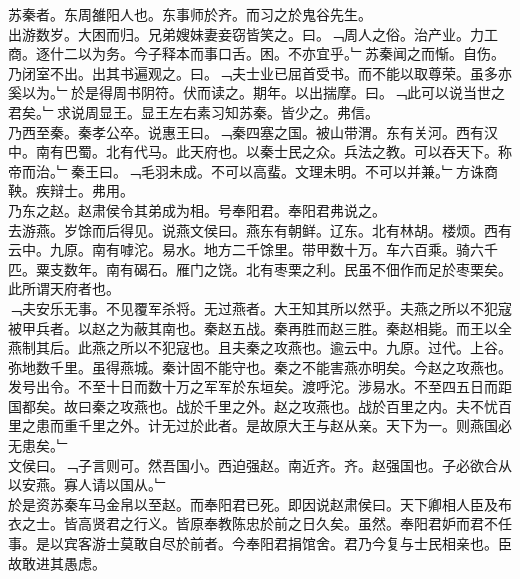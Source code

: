 \documentclass{zhvt-classic}
\begin{document}

\hspace*{2em}苏秦者。东周雒阳人也。东事师於齐。而习之於鬼谷先生。\\
\hspace*{2em}出游数岁。大困而归。兄弟嫂妹妻妾窃皆笑之。曰。﹁周人之俗。治产业。力工商。逐什二以为务。今子释本而事口舌。困。不亦宜乎。﹂苏秦闻之而惭。自伤。乃闭室不出。出其书遍观之。曰。﹁夫士业已屈首受书。而不能以取尊荣。虽多亦奚以为。﹂於是得周书阴符。伏而读之。期年。以出揣摩。曰。﹁此可以说当世之君矣。﹂求说周显王。显王左右素习知苏秦。皆少之。弗信。\\
\hspace*{2em}乃西至秦。秦孝公卒。说惠王曰。﹁秦四塞之国。被山带渭。东有关河。西有汉中。南有巴蜀。北有代马。此天府也。以秦士民之众。兵法之教。可以吞天下。称帝而治。﹂秦王曰。﹁毛羽未成。不可以高蜚。文理未明。不可以并兼。﹂方诛商鞅。疾辩士。弗用。\\
\hspace*{2em}乃东之赵。赵肃侯令其弟成为相。号奉阳君。奉阳君弗说之。\\
\hspace*{2em}去游燕。岁馀而后得见。说燕文侯曰。燕东有朝鲜。辽东。北有林胡。楼烦。西有云中。九原。南有嘑沱。易水。地方二千馀里。带甲数十万。车六百乘。骑六千匹。粟支数年。南有碣石。雁门之饶。北有枣栗之利。民虽不佃作而足於枣栗矣。此所谓天府者也。\\
\hspace*{2em}﹁夫安乐无事。不见覆军杀将。无过燕者。大王知其所以然乎。夫燕之所以不犯寇被甲兵者。以赵之为蔽其南也。秦赵五战。秦再胜而赵三胜。秦赵相毙。而王以全燕制其后。此燕之所以不犯寇也。且夫秦之攻燕也。逾云中。九原。过代。上谷。弥地数千里。虽得燕城。秦计固不能守也。秦之不能害燕亦明矣。今赵之攻燕也。发号出令。不至十日而数十万之军军於东垣矣。渡呼沱。涉易水。不至四五日而距国都矣。故曰秦之攻燕也。战於千里之外。赵之攻燕也。战於百里之内。夫不忧百里之患而重千里之外。计无过於此者。是故原大王与赵从亲。天下为一。则燕国必无患矣。﹂\\
\hspace*{2em}文侯曰。﹁子言则可。然吾国小。西迫强赵。南近齐。齐。赵强国也。子必欲合从以安燕。寡人请以国从。﹂\\
\hspace*{2em}於是资苏秦车马金帛以至赵。而奉阳君已死。即因说赵肃侯曰。天下卿相人臣及布衣之士。皆高贤君之行义。皆原奉教陈忠於前之日久矣。虽然。奉阳君妒而君不任事。是以宾客游士莫敢自尽於前者。今奉阳君捐馆舍。君乃今复与士民相亲也。臣故敢进其愚虑。\\
\end{document}

